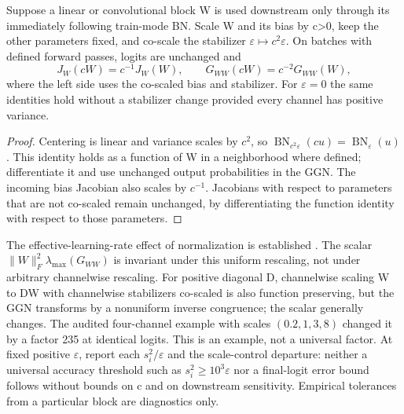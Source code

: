 \begin{proposition}
\label{prop:astra_bn_scale}
Suppose a linear or convolutional block W is used downstream only
through its immediately following train-mode BN. Scale W and its bias
by c>0, keep the other parameters fixed, and co-scale the stabilizer
$\varepsilon\mapsto c^2\varepsilon$. On batches with defined forward
passes, logits are unchanged and
\begin{equation}\label{eq:astra_bn_scale}
 J_W(cW)=c^{-1}J_W(W),\qquad G_{WW}(cW)=c^{-2}G_{WW}(W),
\end{equation}
where the left side uses the co-scaled bias and stabilizer.
For $\varepsilon=0$ the same identities hold without a stabilizer change
provided every channel has positive variance.
\end{proposition}
\begin{proof}
Centering is linear and variance scales by $c^2$, so
$\operatorname{BN}_{c^2\varepsilon}(cu)=\operatorname{BN}_{\varepsilon}(u)$.
This identity holds as a function of W in a neighborhood where defined;
differentiate it and use unchanged output probabilities in the GGN.
The incoming bias Jacobian also scales by $c^{-1}$. Jacobians with
respect to parameters that are not co-scaled remain unchanged, by
differentiating the function identity with respect to those parameters.
\end{proof}
\begin{remark}
The effective-learning-rate effect of normalization is established
\citep{vanlaarhoven2017l2}. The scalar
$\|W\|_F^2\lambda_{\max}(G_{WW})$ is invariant under this uniform
rescaling, not under arbitrary channelwise rescaling. For positive
diagonal D, channelwise scaling W to DW with channelwise stabilizers
co-scaled is also function preserving, but the GGN transforms by a
nonuniform inverse congruence; the scalar generally changes.
The audited four-channel example with scales $(0.2,1,3,8)$ changed it
by a factor 235 at identical logits. This is an example, not a universal
factor. At fixed positive $\varepsilon$, report each $s_i^2/\varepsilon$
and the scale-control departure: neither a universal accuracy threshold
such as $s_i^2\ge10^3\varepsilon$ nor a final-logit error bound follows
without bounds on c and on downstream sensitivity. Empirical tolerances
from a particular block are diagnostics only.
\end{remark}

